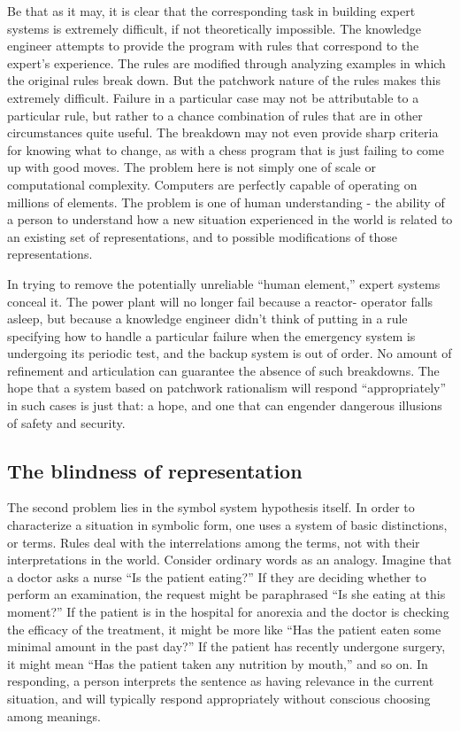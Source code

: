 \documentclass[12pt]{article}
\begin{document}
Be that as it may, it is clear that the corresponding task in building expert systems is extremely difficult, if not theoretically impossible. The knowledge engineer attempts to provide the program with rules that correspond to the expert’s experience. The rules are modified through analyzing examples in which the original rules break down. But the patchwork nature of the rules makes this extremely difficult. Failure in a particular case may not be attributable to a particular rule, but rather to a chance combination of rules that are in other circumstances quite useful. The breakdown may not even provide sharp criteria for knowing what to change, as with a chess program that is just failing to come up with good moves. The problem here is not simply one of scale or computational complexity. Computers are perfectly capable of operating on millions of elements. The problem is one of human understanding - the ability of a person to understand how a new situation experienced in the world is related to an existing set of representations, and to possible modifications of those representations.

In trying to remove the potentially unreliable ``human element,'' expert systems conceal it. The power plant will no longer fail because a reactor- operator falls asleep, but because a knowledge engineer didn’t think of putting in a rule specifying how to handle a particular failure when the emergency system is undergoing its periodic test, and the backup system is out of order. No amount of refinement and articulation can guarantee the absence of such breakdowns. The hope that a system based on patchwork rationalism will respond ``appropriately'' in such cases is just that: a hope, and one that can engender dangerous illusions of safety and security.

\subsection{The blindness of representation}

The second problem lies in the symbol system hypothesis itself. In order to characterize a situation in symbolic form, one uses a system of basic distinctions, or terms. Rules deal with the interrelations among the terms, not with their interpretations in the world.
Consider ordinary words as an analogy. Imagine that a doctor asks a nurse ``Is the patient eating?'' If they are deciding whether to perform an examination, the request might be paraphrased ``Is she eating at this moment?'' If the patient is in the hospital for anorexia and the doctor is checking the efficacy of the treatment, it might be more like ``Has the patient eaten some minimal amount in the past day?'' If the patient has recently undergone surgery, it might mean ``Has the patient taken any nutrition by mouth,'' and so on. In responding, a person interprets the sentence as having relevance in the current situation, and will typically respond appropriately without conscious choosing among meanings.
\end{document}

